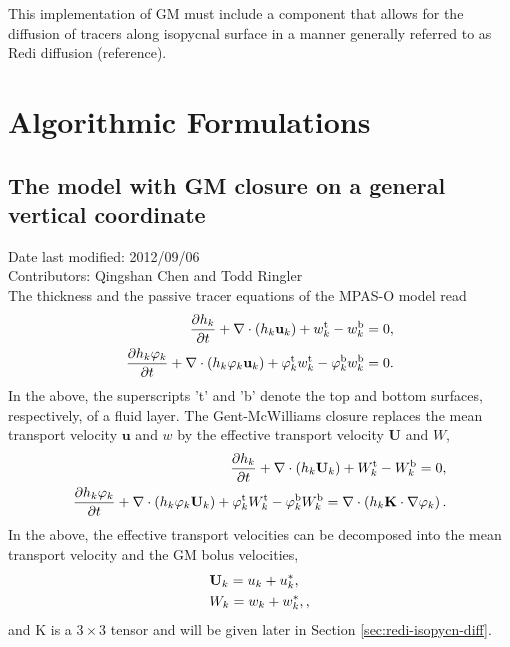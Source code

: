 \documentclass[12pt]{report}
\def\bs{\boldsymbol}
\def\ub{\mathbf{u}}
\def\Ub{\mathbf{U}}
\def\Kb{\bs{\mathrm{K}}}
\begin{document}
This implementation of GM must include a component that allows for the diffusion of tracers along isopycnal surface in a manner generally referred to as Redi diffusion (reference).


\chapter{Algorithmic Formulations}

\section{The model with GM closure on a general vertical coordinate}
Date last modified: 2012/09/06 \\
Contributors: Qingshan Chen and Todd Ringler\\

The thickness and the passive tracer equations of the MPAS-O model read
\begin{align}   
\dfrac{\partial h_k}{\partial t} 
 + \nabla \cdot \left( h_k {\bf u}_k \right) 
 + w_k^\textrm{t} - w_k^\textrm{b} = 0\label{eq:1},
\\
\dfrac{\partial h_k\varphi_k}{\partial t} 
 + \nabla \cdot \left( h_k\varphi_k {\bf u}_k \right) 
  + \varphi_k^\textrm{t} w_k^\textrm{t} - \varphi_k^\textrm{b} w_k^\textrm{b}
= 0.\label{eq:4}
\end{align}
In the above, the superscripts 't' and 'b' denote the top and bottom surfaces,
respectively, of a fluid layer.
The Gent-McWilliams closure replaces the mean transport velocity $\ub$
and $w$ by the effective transport velocity $\Ub$ and $W$,
\begin{align}   
\dfrac{\partial h_k}{\partial t} 
 + \nabla \cdot \left( h_k {\bf U}_k \right) 
 + W_k^\textrm{t} - W_k^\textrm{b} = 0,\label{eq:5}
\\
\dfrac{\partial h_k\varphi_k}{\partial t} 
 + \nabla \cdot \left( h_k\varphi_k{\bf U}_k \right) 
  + \varphi_k^\textrm{t} W_k^\textrm{t} - \varphi_k^\textrm{b} W_k^\textrm{b}  
= \nabla\cdot\left(h_k \Kb \cdot \nabla\varphi_k \right).\label{eq:6}
\end{align}
In the above, the effective transport velocities can be decomposed
into the mean transport velocity and the GM bolus velocities, 
\begin{align}
&{\bf U}_k = u_k + u^\ast_k,\label{eq:7}\\ 
& W_k = w_k + w^\ast_k,\label{eq:8},
\end{align}
and $\Kb$ is a $3\times 3$ tensor and will be given later in Section
\ref{sec:redi-isopycn-diff}. 
\end{document}
